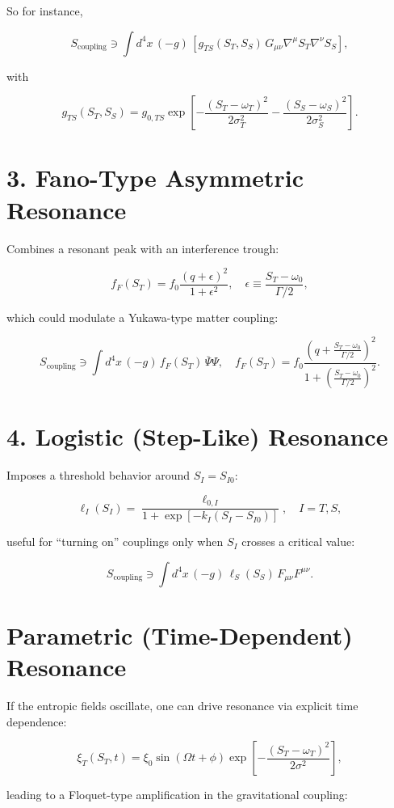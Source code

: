 \documentclass[12pt, a4paper]{article}
\begin{document}
So for instance,

\[
S_{\text{coupling}} \ni \int d^4 x \, (-g)\, \left[g_{TS}(S_T,S_S) \, G_{\mu \nu} \nabla^\mu S_T \nabla^\nu S_S\right],
\]

with

\[
g_{TS}(S_T,S_S) = g_{0,TS} \exp\left[-\frac{(S_T - \omega_T)^2}{2 \sigma_T^2} - \frac{(S_S - \omega_S)^2}{2 \sigma_S^2}\right].
\]

\section*{3. Fano-Type Asymmetric Resonance}

Combines a resonant peak with an interference trough:

\[
f_F(S_T) = f_0 \frac{(q + \epsilon)^2}{1 + \epsilon^2}, \quad \epsilon \equiv \frac{S_T - \omega_0}{\Gamma/2},
\]

which could modulate a Yukawa-type matter coupling:

\[
S_{\text{coupling}} \ni \int d^4 x\, (-g) \, f_F(S_T) \, \overline{\Psi} \Psi,
\quad f_F(S_T) = f_0 \frac{(q + \frac{S_T - \omega_0}{\Gamma/2})^2}{1 + \left(\frac{S_T - \omega_0}{\Gamma/2}\right)^2}.
\]

\section*{4. Logistic (Step-Like) Resonance}

Imposes a threshold behavior around \( S_I = S_{I0} \):

\[
\ell_I(S_I) = \frac{\ell_{0,I}}{1 + \exp[-k_I (S_I - S_{I0})]}, \quad I = T, S,
\]

useful for ``turning on'' couplings only when \(S_I\) crosses a critical value:

\[
S_{\text{coupling}} \ni \int d^4 x\, (-g) \, \ell_S(S_S) \, F_{\mu \nu} F^{\mu \nu}.
\]

\section{Parametric (Time-Dependent) Resonance}

If the entropic fields oscillate, one can drive resonance via explicit time dependence:

\[
\xi_T(S_T,t) = \xi_0 \sin(\Omega t + \phi) \exp\left[-\frac{(S_T - \omega_T)^2}{2 \sigma^2}\right],
\]

leading to a Floquet-type amplification in the gravitational coupling:
\end{document}
